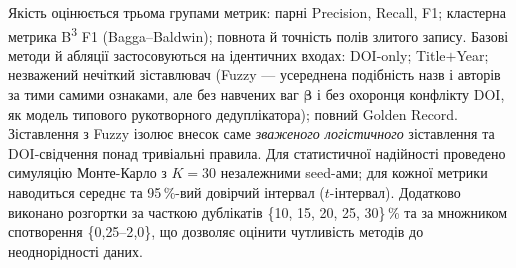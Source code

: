 Якість оцінюється трьома групами метрик: парні Precision, Recall, F1; кластерна метрика B\textsuperscript{3} F1 (Bagga--Baldwin); повнота й точність полів злитого запису. Базові методи й абляції застосовуються на ідентичних входах: DOI-only; Title$+$Year; незважений нечіткий зіставлювач (Fuzzy --- усереднена подібність назв і авторів за тими самими ознаками, але без навчених ваг $\boldsymbol{\beta}$ і без охоронця конфлікту DOI, як модель типового рукотворного дедуплікатора); повний Golden Record. Зіставлення з Fuzzy ізолює внесок саме \textit{зваженого логістичного} зіставлення та DOI-свідчення понад тривіальні правила. Для статистичної надійності проведено симуляцію Монте-Карло з $K=30$ незалежними seed-ами; для кожної метрики наводиться середнє та 95\,\%-вий довірчий інтервал ($t$-інтервал). Додатково виконано розгортки за часткою дублікатів \{10, 15, 20, 25, 30\}\,\% та за множником спотворення \{0{,}25--2{,}0\}, що дозволяє оцінити чутливість методів до неоднорідності даних.
